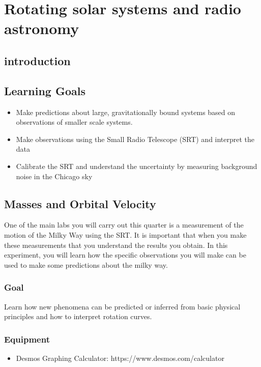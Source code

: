 \chapter{Rotating solar systems and radio astronomy}

\section{introduction} 

\section{Learning Goals}
\begin{itemize}
	\item Make predictions about large, gravitationally bound systems based on observations of smaller scale systems.
	
	\item Make observations using the Small Radio Telescope (SRT) and interpret the data
	
	\item Calibrate the SRT and understand the uncertainty by measuring background noise in the Chicago sky 
\end{itemize}

\section{Masses and Orbital Velocity} %
One of the main labs you will carry out this quarter is a measurement of the motion of the Milky Way using the SRT. It is important that when you make these measurements that you understand the results you obtain. In this experiment, you will learn how the specific observations you will make can be used to make some predictions about the milky way. 

\subsection{Goal}
Learn how new phenomena can be predicted or inferred from basic physical principles and how to interpret rotation curves. 

\subsection{Equipment}

\begin{itemize}
	\item Desmos Graphing Calculator: https://www.desmos.com/calculator
\end{itemize}

